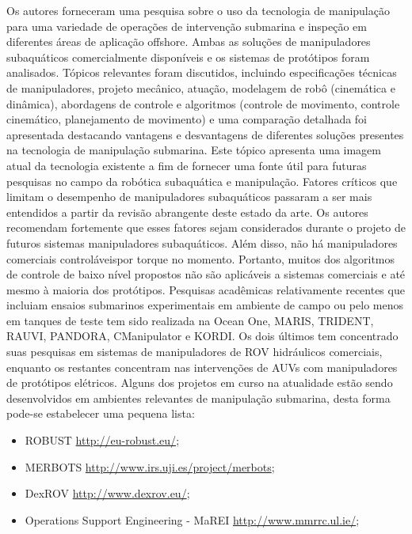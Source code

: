 Os autores forneceram uma pesquisa sobre o uso da tecnologia de manipulação para uma variedade de operações de intervenção submarina e inspeção em diferentes áreas de aplicação offshore. Ambas as soluções de manipuladores subaquáticos comercialmente disponíveis e os sistemas de protótipos foram analisados. Tópicos relevantes foram discutidos, incluindo especificações técnicas de manipuladores, projeto mecânico, atuação, modelagem de robô (cinemática e dinâmica), abordagens de controle e algoritmos (controle de movimento, controle cinemático, planejamento de movimento) e uma comparação detalhada foi apresentada destacando vantagens e desvantagens de diferentes soluções presentes na tecnologia de manipulação submarina. Este tópico apresenta uma imagem atual da tecnologia existente a fim de fornecer uma fonte útil para futuras pesquisas no campo da robótica subaquática e manipulação. Fatores críticos que limitam o desempenho de manipuladores subaquáticos passaram a ser mais entendidos a partir da revisão abrangente deste estado da arte. Os autores recomendam fortemente que esses fatores sejam considerados durante o projeto de futuros sistemas manipuladores subaquáticos.
Além disso, não há manipuladores comerciais controláveis ​​por torque no momento. Portanto, muitos dos algoritmos de controle de baixo nível propostos não são aplicáveis ​​a sistemas comerciais e até mesmo à maioria dos protótipos. Pesquisas acadêmicas relativamente recentes que incluiam ensaios submarinos experimentais em ambiente de campo ou pelo menos em tanques de teste tem sido realizada na Ocean One, MARIS, TRIDENT, RAUVI, PANDORA, CManipulator e KORDI.
Os dois últimos tem concentrado suas pesquisas em sistemas de manipuladores de ROV hidráulicos comerciais, enquanto os restantes concentram nas intervenções de AUVs com manipuladores de protótipos elétricos.
Alguns dos projetos em curso na atualidade estão sendo desenvolvidos em ambientes relevantes de manipulação submarina, desta forma pode-se estabelecer uma pequena lista:
\begin{itemize}
	\item ROBUST \url{http://eu-robust.eu/};
	\item MERBOTS \url{http://www.irs.uji.es/project/merbots}; 
	\item DexROV \url{http://www.dexrov.eu/};
	\item Operations Support Engineering - MaREI \url{http://www.mmrrc.ul.ie/};
\end{itemize}